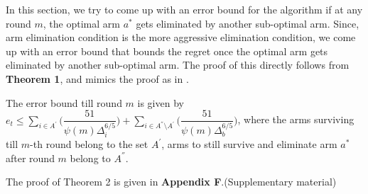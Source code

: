 	In this section, we try to come up with an error bound for the algorithm if at any round $m$, the optimal arm $a^{*}$ gets eliminated by another sub-optimal arm. Since, arm elimination condition is the more aggressive elimination condition, we come up with an error bound that bounds the regret once the  optimal arm gets eliminated by another sub-optimal arm. The proof of this directly follows from \textbf{Theorem 1}, and mimics the proof as in \cite{auer2010ucb}.
	
\begin{theorem}
The error bound till round $m$ is given by $e_{t}\leq \sum_{i\in A^{'}}\bigg(\dfrac{51}{\psi(m)\Delta_{i}^{6/5}} \bigg)+\sum_{i\in A^{''}\setminus A^{'}}\bigg(\dfrac{51}{\psi(m)\Delta_{b}^{6/5}} \bigg)$, where the arms surviving till $m$-th round belong to the set $A^{'}$, arms to still survive and eliminate arm $a^{*}$ after round $m$ belong to $A^{''}$.
\end{theorem}
The proof of Theorem 2 is given in \textbf{Appendix F}.(Supplementary material)
